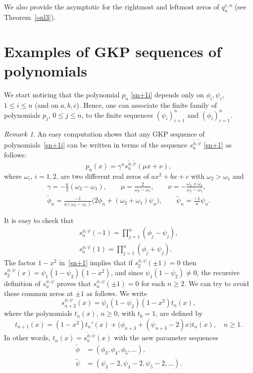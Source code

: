 \documentclass[10pt, a4paper, leqno]{amsart}
\numberwithin{equation}{section}
\theoremstyle{plain}
\theoremstyle{remark}
\newtheorem{Rem}{Remark}[section]
\newcommand{\spp}{s^{\phi,\psi}}
\begin{document}
We also provide the asymptotic for the rightmost and leftmost zeros of $q_n^{v,u}$ (see Theorem~\ref{onl3}).

\section{Examples of GKP sequences of polynomials}
\label{sec2}

We start noticing that the polynomial $p_n$ \eqref{sn+1i} depends only on $\phi_i,\psi_i$, $1\le i\le n$ (and on $a,b,c$). Hence, one can associate the finite family of polynomials $p_j$, $0\le j\le n$, to the finite sequences $(\psi_i)_{i=1}^n$ and $(\phi_i)_{i=1}^n$.

\begin{Rem}
\label{misi}
An easy computation shows that any GKP sequence of polynomials~\eqref{sn+1i} can be written in terms of the sequence $s_n^{\tilde \phi,\tilde \psi}$ \eqref{sn+1} as follows:
\[
p_n(x) = \gamma^n s_n^{\tilde \phi,\tilde \psi}(\mu x + \nu),
\]
where $\omega_i$, $i=1,2$, are two different real zeros of $ax^2+bx+c$ with $\omega_2>\omega_1$ and
\begin{gather*}
  \gamma = -\frac{a}{2}(\omega_2-\omega_1),
  \qquad \mu = \frac{2}{\omega_2-\omega_1},
  \qquad \nu = -\frac{\omega_2+\omega_1}{\omega_2-\omega_1},
  \\
  \tilde{\phi}_n = \frac{-1}{a(\omega_2-\omega_1)} \Big( 2\phi_n + (\omega_2+\omega_1)\psi_n \Big),
  \qquad \tilde{\psi}_n = \frac{-1}{a} \psi_n.
\end{gather*}
\end{Rem}

It is easy to check that
\begin{align}
\label{va-1}
  \spp_n(-1) = \prod_{j=1}^n(\phi_{j}-\psi_j),
  \\
\label{va1}
  \spp_n(1) = \prod_{j=1}^n(\phi_{j}+\psi_j).
\end{align}
The factor $1-x^2$ in~\eqref{sn+1} implies that
if $\spp_2(\pm 1) = 0$ then
$\spp_2(x) = \psi_1 (1 - \psi_2)(1-x^2)$, and
since $\psi_1 (1 - \psi_2) \ne 0$, the recursive definition of $\spp_n$ proves that $\spp_n(\pm 1) = 0$ for each $n \ge 2$. We can try to avoid these common zeros at $\pm 1$ as follows.
We write
\begin{equation}
\label{zemm}
  \spp_{n+2}(x) = \psi_1 (1 - \psi_2)(1-x^2) t_n(x),
\end{equation}
where the polynomials $t_n(x)$, $n \ge 0$, with $t_0 = 1$, are defined by
\[
  t_{n+1}(x) = (1-x^2) t_n'(x)
  + \Big(\phi_{n+3} + (\psi_{n+3}-2) x\Big) t_n(x),\quad n\ge 1.
\]
In other words, $t_n(x) = s_{n}^{\tilde \phi,\tilde\psi}(x)$ with the new parameter sequences
\begin{align*}
  \tilde\phi &= (\phi_3, \phi_4, \phi_5, \dots),
  \\
  \tilde\psi &= (\psi_3-2, \psi_4-2, \psi_5-2, \dots).
\end{align*}
\end{document}
